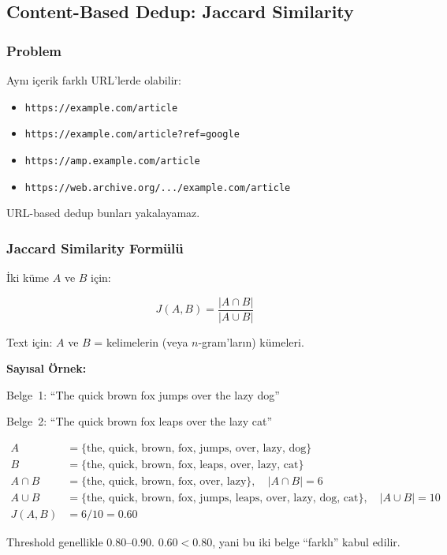 \subsection{Content-Based Dedup: Jaccard Similarity}
\label{subsec:jaccard}

\subsubsection{Problem}

Ayn{\i} i\c{c}erik farkl{\i} URL'lerde olabilir:
\begin{itemize}
  \item \texttt{https://example.com/article}
  \item \texttt{https://example.com/article?ref=google}
  \item \texttt{https://amp.example.com/article}
  \item \texttt{https://web.archive.org/.../example.com/article}
\end{itemize}

\noindent
URL-based dedup bunlar{\i} yakalayamaz.

\subsubsection{Jaccard Similarity Form\"{u}l\"{u}}

\.{I}ki k\"{u}me $A$ ve $B$ i\c{c}in:

\begin{formulbox}
\begin{equation}
J(A, B) = \frac{|A \cap B|}{|A \cup B|}
\label{eq:jaccard}
\end{equation}

Text i\c{c}in: $A$ ve $B$ = kelimelerin (veya $n$-gram'lar{\i}n) k\"{u}meleri.
\end{formulbox}

\begin{ornek}
\textbf{Say{\i}sal \"{O}rnek:}

Belge~1: ``The quick brown fox jumps over the lazy dog''

Belge~2: ``The quick brown fox leaps over the lazy cat''

\begin{align*}
A &= \{\text{the, quick, brown, fox, jumps, over, lazy, dog}\} \\
B &= \{\text{the, quick, brown, fox, leaps, over, lazy, cat}\} \\
A \cap B &= \{\text{the, quick, brown, fox, over, lazy}\}, \quad |A \cap B| = 6 \\
A \cup B &= \{\text{the, quick, brown, fox, jumps, leaps, over, lazy, dog, cat}\}, \quad |A \cup B| = 10 \\
J(A, B) &= 6/10 = 0.60
\end{align*}

Threshold genellikle $0.80\text{--}0.90$. $0.60 < 0.80$, yani bu iki belge ``farkl{\i}'' kabul edilir.
\end{ornek}

